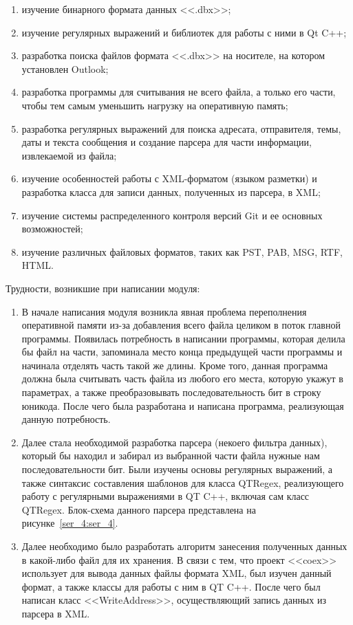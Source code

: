 \begin{enumerate}
  \item изучение бинарного формата данных <<.dbx>>;
  \item изучение регулярных выражений и библиотек для работы с ними в Qt C++;
  \item разработка поиска файлов формата <<.dbx>> на носителе, на котором установлен Outlook;
  \item разработка программы для считывания не всего файла, а только его части, чтобы тем самым 
  уменьшить нагрузку на оперативную память;
  \item разработка регулярных выражений для поиска адресата, отправителя, темы, даты и 
  текста сообщения и создание парсера для части информации, извлекаемой из файла;
  \item изучение особенностей работы с XML-форматом (языком разметки) и разработка класса для 
  записи данных, полученных из парсера, в XML;
  \item изучение системы распределенного контроля версий Git и ее основных возможностей;
  \item изучение различных файловых форматов, таких как PST, PAB, MSG, RTF, HTML.  
\end{enumerate}


Трудности, возникшие при написании модуля:

\begin{enumerate}
  \item В начале написания модуля  возникла явная проблема переполнения оперативной 
  памяти из-за добавления всего файла целиком в поток главной программы. 
  Появилась потребность в написании программы, которая делила бы файл на части, 
  запоминала место конца предыдущей части программы и начинала отделять часть 
  такой же длины. Кроме того, данная программа должна была считывать часть файла из любого его места, 
  которую укажут в параметрах, а также преобразовывать последовательность бит в строку юникода. 
  После чего была разработана и написана программа, реализующая данную потребность.
  \item Далее стала необходимой разработка парсера (некоего фильтра данных), который бы находил и 
  забирал из выбранной части файла нужные нам последовательности бит. Были изучены основы регулярных 
  выражений, а также синтаксис составления шаблонов для класса QTRegex, реализующего работу с  
  регулярными выражениями в QT C++, включая сам класс QTRegex. Блок-схема данного парсера представлена 
  на рисунке~\ref{ser_4:ser_4}.
  \item Далее необходимо было разработать алгоритм занесения полученных данных в какой-либо 
  файл для их хранения. В связи с тем, что проект <<coex>> использует для вывода данных 
  файлы формата XML, был изучен данный формат, а также классы для работы с ним в QT C++. 
  После чего был написан класс <<WriteAddress>>, осуществляющий запись данных из парсера в XML. 
\end{enumerate}


